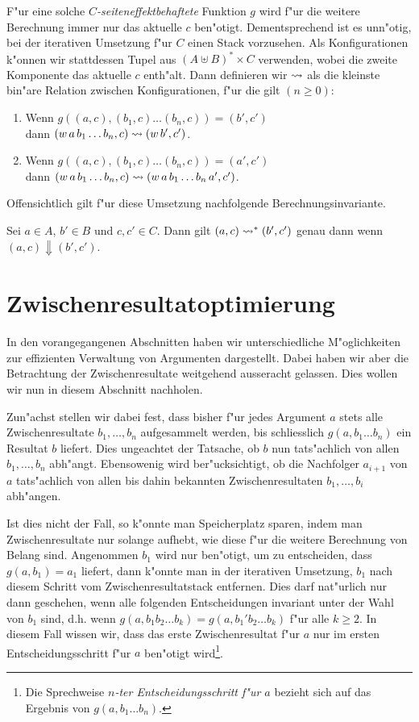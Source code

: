 \documentclass[12pt,a4paper]{article}
\begin{document}
F"ur eine solche \emph{$C$-seiteneffektbehaftete} Funktion $g$ wird f"ur die weitere Berechnung
immer nur das aktuelle $c$ ben"otigt. Dementsprechend ist es unn"otig, bei der iterativen Umsetzung
f"ur $C$ einen Stack vorzusehen. Als Konfigurationen k"onnen wir stattdessen Tupel aus
$(A \uplus B)^* \times C$ verwenden, wobei die zweite Komponente das aktuelle $c$ enth"alt. Dann
definieren wir $\rightsquigarrow$ als die kleinste bin"are Relation zwischen Konfigurationen, f"ur die gilt
$(n \ge 0)$:
\begin{enumerate}
\item Wenn $g((a,c),(b_1,c) \ldots (b_n,c)) = (b',c')$ \\
  dann $(w\,a\,b_1 \ldots b_n,c) \rightsquigarrow (w\,b',c')$.
\item Wenn $g((a,c),(b_1,c) \ldots (b_n,c)) = (a',c')$ \\
  dann $(w\,a\,b_1 \ldots b_n,c) \rightsquigarrow (w\,a\,b_1 \ldots b_n\,a',c')$.
\end{enumerate}
Offensichtlich gilt f"ur diese Umsetzung nachfolgende Berechnungsinvariante.

\begin{lemma}
  Sei $a \in A$, $b' \in B$ und $c,c' \in C$. Dann gilt $(a,c) \rightsquigarrow^* (b',c')$
  genau dann wenn $(a,c) \Downarrow (b',c')$.
\end{lemma}


\section{Zwischenresultatoptimierung}

In den vorangegangenen Abschnitten haben wir unterschiedliche M"oglichkeiten zur effizienten Verwaltung
von Argumenten dargestellt. Dabei haben wir aber die Betrachtung der Zwischenresultate weitgehend ausseracht
gelassen. Dies wollen wir nun in diesem Abschnitt nachholen.

Zun"achst stellen wir dabei fest, dass bisher f"ur jedes Argument $a$ stets alle Zwischenresultate
$b_1,\ldots,b_n$ aufgesammelt werden, bis schliesslich $g(a,b_1 \ldots b_n)$ ein Resultat $b$ liefert.
Dies ungeachtet der Tatsache, ob $b$ nun tats"achlich von allen $b_1,\ldots,b_n$ abh"angt. Ebensowenig
wird ber"ucksichtigt, ob die Nachfolger $a_{i+1}$ von $a$ tats"achlich von allen bis dahin bekannten
Zwischenresultaten $b_1,\ldots,b_i$ abh"angen.

Ist dies nicht der Fall, so k"onnte man Speicherplatz sparen, indem man Zwischenresultate nur solange
aufhebt, wie diese f"ur die weitere Berechnung von Belang sind. Angenommen $b_1$ wird nur ben"otigt,
um zu entscheiden, dass $g(a,b_1)=a_1$ liefert, dann k"onnte man in der iterativen Umsetzung, $b_1$
nach diesem Schritt vom Zwischenresultatstack entfernen. Dies darf nat"urlich nur dann geschehen,
wenn alle folgenden Entscheidungen invariant unter der Wahl von $b_1$ sind, d.h. wenn
$g(a,b_1 b_2\ldots b_k) = g(a,b_1' b_2 \ldots b_k)$ f"ur alle $k \ge 2$. In diesem Fall wissen wir,
dass das erste Zwischenresultat f"ur $a$ nur im ersten Entscheidungsschritt f"ur $a$ ben"otigt
wird\footnote{Die Sprechweise \emph{$n$-ter Entscheidungsschritt f"ur $a$} bezieht sich auf das
Ergebnis von $g(a,b_1 \ldots b_n)$.}.
\end{document}
